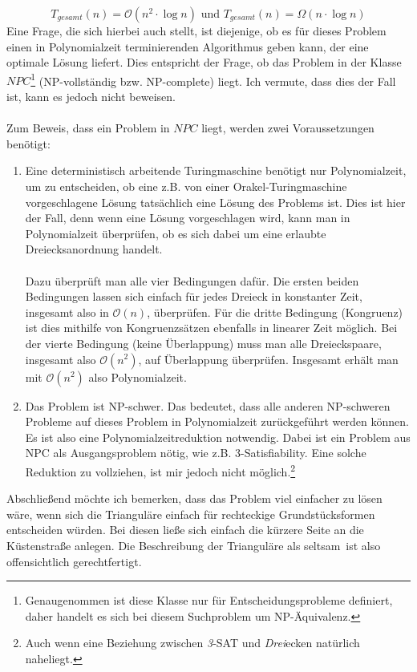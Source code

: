 \documentclass[a4paper, notitlepage, 12pt]{scrartcl}
\begin{document}
\begin{equation}
T_{gesamt}(n) = \mathcal{O}(n^2 \cdot \log n) \text{~und~} T_{gesamt}(n) = \Omega(n \cdot \log n)
\end{equation}
 Eine Frage, die sich hierbei auch stellt, ist diejenige, ob es für dieses Problem einen in Polynomialzeit terminierenden Algorithmus geben kann, der eine optimale Lösung liefert. Dies entspricht der Frage, ob das Problem in der Klasse $NPC$\footnote{Genaugenommen ist diese Klasse nur für Entscheidungsprobleme definiert, daher handelt es sich bei diesem Suchproblem um NP-Äquivalenz.} (NP-vollständig bzw. NP-complete) liegt. Ich vermute, dass dies der Fall ist, kann es jedoch nicht beweisen. \\ \\
 Zum Beweis, dass ein Problem in $NPC$ liegt, werden zwei Voraussetzungen benötigt:
 \begin{enumerate}
 	\item Eine deterministisch arbeitende Turingmaschine benötigt nur Polynomialzeit, um zu entscheiden, ob eine z.B. von einer Orakel-Turingmaschine vorgeschlagene Lösung tatsächlich eine Lösung des Problems ist. Dies ist hier der Fall, denn wenn eine Lösung vorgeschlagen wird, kann man in Polynomialzeit überprüfen, ob es sich dabei um eine erlaubte Dreiecksanordnung handelt. \\ \\ Dazu überprüft man alle vier Bedingungen dafür. Die ersten beiden Bedingungen lassen sich einfach für jedes Dreieck in konstanter Zeit, insgesamt also in $\mathcal{O}(n)$, überprüfen. Für die dritte Bedingung (Kongruenz) ist dies mithilfe von Kongruenzsätzen ebenfalls in linearer Zeit möglich. Bei der vierte Bedingung  (keine Überlappung) muss man alle Dreieckspaare, insgesamt also $\mathcal{O}(n^2)$, auf Überlappung überprüfen. Insgesamt erhält man mit $\mathcal{O}(n^2)$ also Polynomialzeit.
 	\item Das Problem ist NP-schwer. Das bedeutet, dass alle anderen NP-schweren Probleme auf dieses Problem in Polynomialzeit zurückgeführt werden können. Es ist also eine Polynomialzeitreduktion notwendig. Dabei ist ein Problem aus NPC als Ausgangsproblem nötig, wie z.B. 3-Satisfiability. Eine solche Reduktion zu vollziehen, ist mir jedoch nicht möglich.\footnote{Auch wenn eine Beziehung zwischen \textit{3}-SAT und \textit{Drei}ecken natürlich naheliegt.}
 \end{enumerate}
Abschließend möchte ich bemerken, dass das Problem viel einfacher zu lösen wäre, wenn sich die Trianguläre einfach für rechteckige Grundstücksformen entscheiden würden. Bei diesen ließe sich einfach die kürzere Seite an die Küstenstraße anlegen. Die Beschreibung der Trianguläre als \glqq seltsam\grqq~ist also offensichtlich gerechtfertigt.
\end{document}
